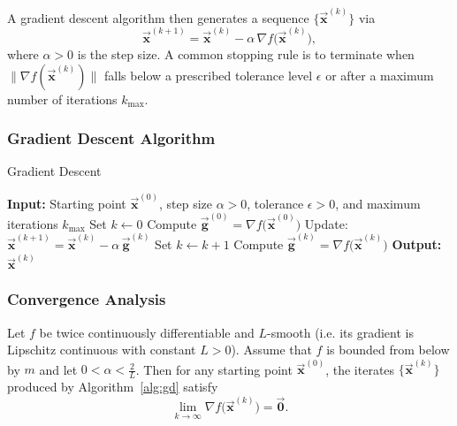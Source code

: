 \documentclass[9pt, headings=standardclasses, parskip=half]{scrartcl}
\newcommand{\vect}[1]{\vec{\boldsymbol{#1}}}
\begin{document}
A gradient descent algorithm then generates a sequence \(\{\vect{x}^{(k)}\}\) via
\[
\vect{x}^{(k+1)}=\vect{x}^{(k)}-\alpha\,\nabla f\bigl(\vect{x}^{(k)}\bigr),
\]
where \(\alpha>0\) is the step size. 
A common stopping rule is to terminate when \(\|\nabla f(\vect{x}^{(k)})\|\) falls below a prescribed tolerance level \(\epsilon\) or after a maximum number of iterations \(k_{\max}\).

\subsubsection{Gradient Descent Algorithm}
\begin{algorithm}[H]
\caption{Gradient Descent}\label{alg:gd}
\begin{algorithmic}[1]
    \State \textbf{Input:} Starting point \(\vect{x}^{(0)}\), step size \(\alpha>0\), tolerance \(\epsilon>0\), and maximum iterations \(k_{\max}\)
    \State Set \(k\gets0\)
    \State Compute \(\vect{g}^{(0)}=\nabla f\bigl(\vect{x}^{(0)}\bigr)\)
    \While{\(\|\vect{g}^{(k)}\|>\epsilon\) and \(k<k_{\max}\)}
        \State Update: \(\vect{x}^{(k+1)}=\vect{x}^{(k)}-\alpha\,\vect{g}^{(k)}\)
        \State Set \(k\gets k+1\)
        \State Compute \(\vect{g}^{(k)}=\nabla f\bigl(\vect{x}^{(k)}\bigr)\)
    \EndWhile
    \State \textbf{Output:} \(\vect{x}^{(k)}\)
\end{algorithmic}
\end{algorithm}

\subsubsection{Convergence Analysis}
\label{subsec:gd_convergence}
\begin{theorem}
\label{thm:gd_conv}
Let \(f\) be twice continuously differentiable and \(L\)-smooth (i.e. its gradient is Lipschitz continuous with constant \(L>0\)). Assume that \(f\) is bounded from below by \(m\) and let \( 0<\alpha<\frac{2}{L}\).
Then for any starting point \(\vect{x}^{(0)}\), the iterates \(\{\vect{x}^{(k)}\}\) produced by Algorithm~\ref{alg:gd} satisfy
\begin{equation}
\label{eq:gd_conv}
\lim_{k\to\infty}\nabla f\bigl(\vect{x}^{(k)}\bigr)=\vect{0}.
\end{equation}
\end{theorem}
\end{document}
